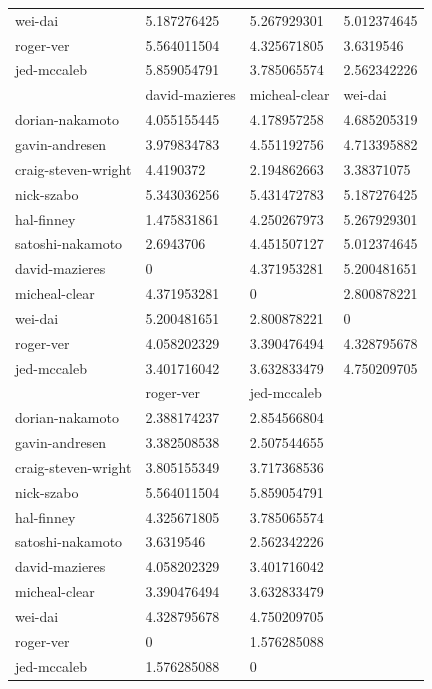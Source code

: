 \documentclass{article}%
\begin{document}
\begin{table}[]
\begin{tabular}{llll}
wei-dai             & 5.187276425     & 5.267929301    & 5.012374645         \\
roger-ver           & 5.564011504     & 4.325671805    & 3.6319546           \\
jed-mccaleb         & 5.859054791     & 3.785065574    & 2.562342226         \\
                    & david-mazieres  & micheal-clear  & wei-dai             \\
dorian-nakamoto     & 4.055155445     & 4.178957258    & 4.685205319         \\
gavin-andresen      & 3.979834783     & 4.551192756    & 4.713395882         \\
craig-steven-wright & 4.4190372       & 2.194862663    & 3.38371075          \\
nick-szabo          & 5.343036256     & 5.431472783    & 5.187276425         \\
hal-finney          & 1.475831861     & 4.250267973    & 5.267929301         \\
satoshi-nakamoto    & 2.6943706       & 4.451507127    & 5.012374645         \\
david-mazieres      & 0               & 4.371953281    & 5.200481651         \\
micheal-clear       & 4.371953281     & 0              & 2.800878221         \\
wei-dai             & 5.200481651     & 2.800878221    & 0                   \\
roger-ver           & 4.058202329     & 3.390476494    & 4.328795678         \\
jed-mccaleb         & 3.401716042     & 3.632833479    & 4.750209705         \\
                    & roger-ver       & jed-mccaleb    &                     \\
dorian-nakamoto     & 2.388174237     & 2.854566804    &                     \\
gavin-andresen      & 3.382508538     & 2.507544655    &                     \\
craig-steven-wright & 3.805155349     & 3.717368536    &                     \\
nick-szabo          & 5.564011504     & 5.859054791    &                     \\
hal-finney          & 4.325671805     & 3.785065574    &                     \\
satoshi-nakamoto    & 3.6319546       & 2.562342226    &                     \\
david-mazieres      & 4.058202329     & 3.401716042    &                     \\
micheal-clear       & 3.390476494     & 3.632833479    &                     \\
wei-dai             & 4.328795678     & 4.750209705    &                     \\
roger-ver           & 0               & 1.576285088    &                     \\
jed-mccaleb         & 1.576285088     & 0              &                    
\end{tabular}


\end{table}
\end{document}
